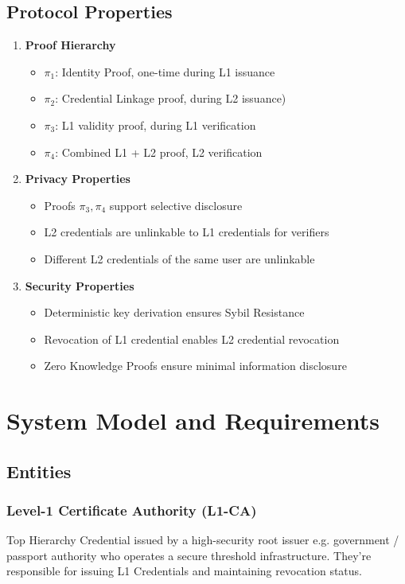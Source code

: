 \subsection{Protocol Properties}
\begin{enumerate}
    \item \textbf{Proof Hierarchy}
    \begin{itemize}
        \item $\pi_1$: Identity Proof, one-time during L1 issuance
        \item $\pi_2$: Credential Linkage proof, during L2 issuance)
        \item $\pi_3$: L1 validity proof, during L1 verification
        \item $\pi_4$: Combined L1 + L2 proof, L2 verification
    \end{itemize}

    \item \textbf{Privacy Properties}
    \begin{itemize}
        \item Proofs $\pi_3, \pi_4$ support selective disclosure
        \item L2 credentials are unlinkable to L1 credentials for verifiers
        \item Different L2 credentials of the same user are unlinkable 
    \end{itemize}

    \item \textbf{Security Properties}
    \begin{itemize}
        \item Deterministic key derivation ensures Sybil Resistance
        \item Revocation of L1 credential enables L2 credential revocation
        \item Zero Knowledge Proofs ensure minimal information disclosure
    \end{itemize}
\end{enumerate}


\section{System Model and Requirements}

\subsection{Entities}

\subsubsection{Level-1 Certificate Authority (L1-CA)}
Top Hierarchy Credential issued by a high-security root issuer e.g. government / passport authority who operates a secure threshold infrastructure. They're responsible for issuing L1 Credentials and maintaining revocation status.

